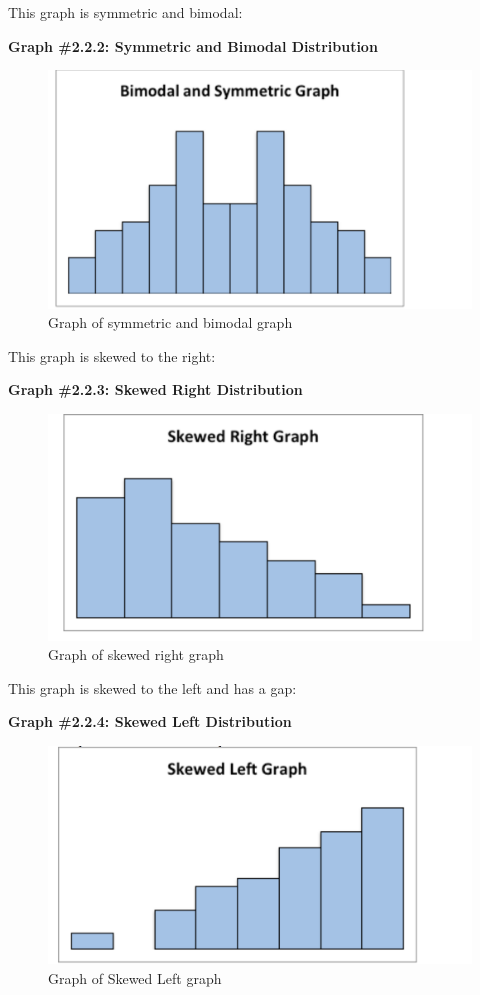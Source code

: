 \documentclass[
]{book}
\begin{document}
This graph is symmetric and bimodal:

\textbf{Graph \#2.2.2: Symmetric and Bimodal Distribution}

\begin{figure}
\centering
\includegraphics{bimodal_symmetric.png}
\caption{Graph of symmetric and bimodal graph}
\end{figure}

This graph is skewed to the right:

\textbf{Graph \#2.2.3: Skewed Right Distribution}

\begin{figure}
\centering
\includegraphics{skewed_right.png}
\caption{Graph of skewed right graph}
\end{figure}

This graph is skewed to the left and has a gap:

\textbf{Graph \#2.2.4: Skewed Left Distribution}

\begin{figure}
\centering
\includegraphics{skewed_left.png}
\caption{Graph of Skewed Left graph}
\end{figure}
\end{document}
